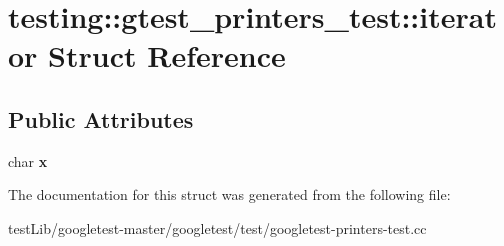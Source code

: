 \hypertarget{structtesting_1_1gtest__printers__test_1_1iterator}{}\section{testing\+:\+:gtest\+\_\+printers\+\_\+test\+:\+:iterator Struct Reference}
\label{structtesting_1_1gtest__printers__test_1_1iterator}
\subsection*{Public Attributes}
\begin{DoxyCompactItemize}
\item 
\mbox{\label{structtesting_1_1gtest__printers__test_1_1iterator_a3d4d056077d3b3869259bdfd60a0778f}} 
char {\bfseries x}
\end{DoxyCompactItemize}


The documentation for this struct was generated from the following file\+:\begin{DoxyCompactItemize}
\item 
test\+Lib/googletest-\/master/googletest/test/googletest-\/printers-\/test.\+cc\end{DoxyCompactItemize}
